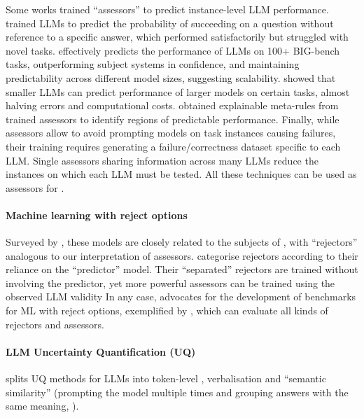 Some works trained ``assessors'' to predict instance-level LLM performance. %
\citet{kadavath2022language} trained LLMs to predict the probability of succeeding on a question without reference to %
a specific answer, %
which performed satisfactorily but struggled with novel tasks. 
\citet{schellaert2024analysing} effectively predicts the performance of LLMs on 100+ BIG-bench tasks, outperforming subject systems in confidence, and maintaining predictability across different model sizes, suggesting scalability.
\citet{zhou2022reject}  showed that smaller LLMs can %
predict performance of %
larger models %
on certain tasks, almost halving errors and computational costs. %
\citet{DRAPAL2024112351} obtained explainable meta-rules from trained assessors to identify regions of predictable performance. 
Finally, while assessors allow to avoid prompting models on task instances causing failures, their training requires generating a failure/correctness dataset specific to each LLM. Single assessors  sharing information across many LLMs \citet{pacchiardi2024100instancesneedpredicting} reduce the instances on which each LLM must be tested.
All these techniques can be used as assessors for 
\predbench.


\paragraph{Machine learning with reject options} %
Surveyed by \citet{hendrickx2024machine}, these models are closely related %
to the subjects of \predbench, with ``rejectors'' analogous to our interpretation of assessors. \citet{hendrickx2024machine} categorise rejectors according to their reliance on the ``predictor'' model.  %
Their ``separated'' rejectors are trained without involving the predictor, yet more powerful assessors %
can be trained using the observed LLM validity %
In any case, \citet{hendrickx2024machine} advocates for the %
development of benchmarks for %
ML with reject options, exemplified by %
\predbench, which can evaluate all kinds of rejectors and assessors.%

\paragraph{LLM Uncertainty Quantification (UQ)}
\citet{shorinwa} splits UQ methods for LLMs into token-level \citep{kadavath2022language}, verbalisation \citep{lin2022teaching, kapoor} and ``semantic similarity'' (prompting the model multiple times and grouping answers with the same meaning, \citealp{kuhn2023semantic}). 

